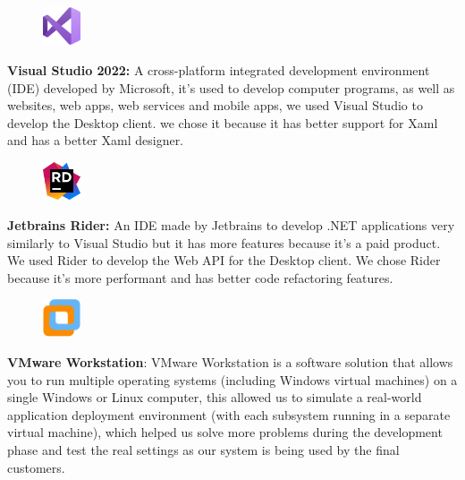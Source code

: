 \documentclass[]{uc2pfecaneva}
\begin{document}
    

    \begin{figure}
        \includegraphics[width=0.10\textwidth]{images/vs}
    \end{figure} \noindent
    \textbf{Visual Studio 2022: } A cross-platform integrated development environment (IDE) developed by Microsoft, it’s used to develop computer programs, as well as websites, web apps, web services and mobile apps, we used Visual Studio to develop the Desktop client.
    we chose it because it has better support for Xaml and has a better Xaml designer.

    \begin{figure}
        \includegraphics[width=0.10\textwidth]{images/rider}
        \vspace{-30pt}
    \end{figure} \noindent
    \textbf{Jetbrains Rider: }  An IDE made by Jetbrains to develop .NET applications very similarly to Visual Studio but it has more features because it’s a paid product.
    We used Rider to develop the Web API for the Desktop client.
    We chose Rider because it’s more performant and has better code refactoring features.

    \begin{figure}
        \includegraphics[width=0.10\textwidth]{images/vm}
    \end{figure} \noindent
    \textbf{VMware Workstation}: VMware Workstation is a software solution that allows you to run multiple operating systems (including Windows virtual machines) on a single Windows or Linux computer, this allowed us to simulate a real-world application deployment environment (with each subsystem running in a separate virtual machine), which helped us solve more problems during the development phase and test the real settings as our system is being used by the final customers.  \\
\end{document}
